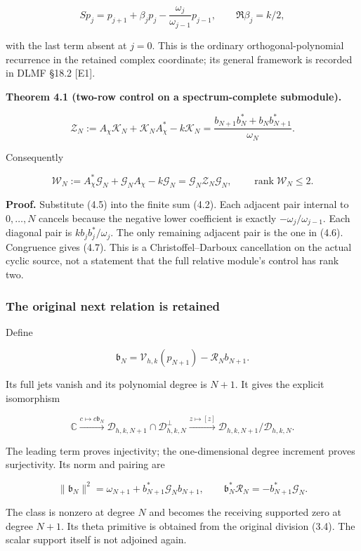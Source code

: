 \documentclass[
]{article}
\begin{document}
\[Sp_j=p_{j+1}+\beta_jp_j-\frac{\omega_j}{\omega_{j-1}}p_{j-1},\qquad
\Re\beta_j=k/2,\tag{4.5}\]

with the last term absent at \(j=0\). This is the ordinary
orthogonal-polynomial recurrence in the retained complex coordinate; its
general framework is recorded in DLMF §18.2 {[}E1{]}.

\textbf{Theorem 4.1 (two-row control on a spectrum-complete submodule).}

\[\boxed{\mathcal Z_N:=A_\chi\mathcal K_N+\mathcal K_NA_\chi^*-k\mathcal K_N
=\frac{b_{N+1}b_N^*+b_Nb_{N+1}^*}{\omega_N}.}\tag{4.6}\]

Consequently

\[\boxed{\mathcal W_N:=A_\chi^*\mathcal G_N+\mathcal G_NA_\chi-k\mathcal G_N
=\mathcal G_N\mathcal Z_N\mathcal G_N,\qquad \operatorname{rank}\mathcal W_N\le2.}\tag{4.7}\]

\textbf{Proof.} Substitute (4.5) into the finite sum (4.2). Each
adjacent pair internal to \(0,\ldots,N\) cancels because the negative
lower coefficient is exactly \(-\omega_j/\omega_{j-1}\). Each diagonal
pair is \(k b_jb_j^*/\omega_j\). The only remaining adjacent pair is the
one in (4.6). Congruence gives (4.7). This is a Christoffel--Darboux
cancellation on the actual cyclic source, not a statement that the full
relative module's control has rank two.

\subsubsection{The original next relation is
retained}\label{the-original-next-relation-is-retained}

Define

\[\mathfrak b_N=\mathcal V_{h,k}(p_{N+1})-\mathcal R_Nb_{N+1}.\]

Its full jets vanish and its polynomial degree is \(N+1\). It gives the
explicit isomorphism

\[\boxed{\mathbb C\xrightarrow{c\mapsto c\mathfrak b_N}
\mathcal D_{h,k,N+1}\cap\mathcal D_{h,k,N}^{\perp}
\xrightarrow{z\mapsto[z]}
\mathcal D_{h,k,N+1}/\mathcal D_{h,k,N}.}\tag{4.8}\]

The leading term proves injectivity; the one-dimensional degree
increment proves surjectivity. Its norm and pairing are

\[\|\mathfrak b_N\|^2=\omega_{N+1}+b_{N+1}^*\mathcal G_Nb_{N+1},\qquad
\mathfrak b_N^*\mathcal R_N=-b_{N+1}^*\mathcal G_N.\tag{4.9}\]

The class is nonzero at degree \(N\) and becomes the receiving supported
zero at degree \(N+1\). Its theta primitive is obtained from the
original division (3.4). The scalar support itself is not adjoined
again.
\end{document}
